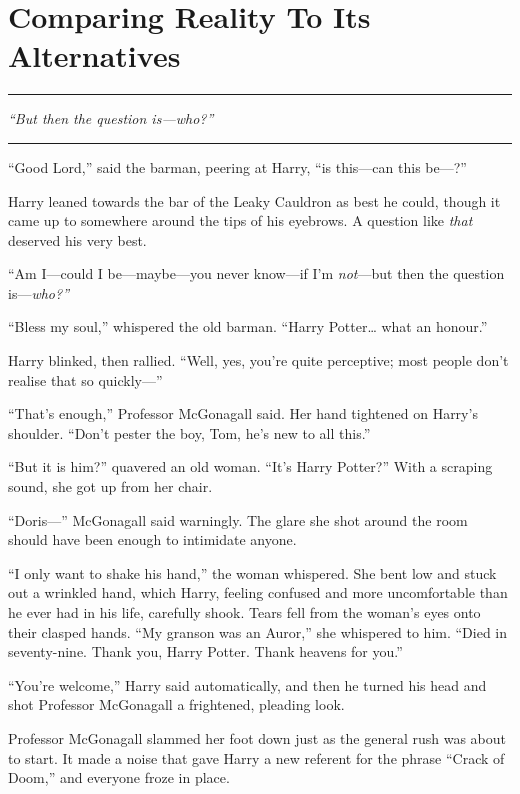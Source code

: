 \chapter{Comparing Reality To Its
Alternatives}\label{comparing-reality-to-its-alternatives}

\begin{center}\rule{3in}{0.4pt}\end{center}

\emph{``But then the question is---who?''}

\begin{center}\rule{3in}{0.4pt}\end{center}

``Good Lord,'' said the barman, peering at Harry, ``is this---can this
be---?''

Harry leaned towards the bar of the Leaky Cauldron as best he could,
though it came up to somewhere around the tips of his eyebrows. A
question like \emph{that} deserved his very best.

``Am I---could I be---maybe---you never know---if I'm \emph{not}---but
then the question is---\emph{who?''}

``Bless my soul,'' whispered the old barman. ``Harry Potter\ldots{} what
an honour.''

Harry blinked, then rallied. ``Well, yes, you're quite perceptive; most
people don't realise that so quickly---''

``That's enough,'' Professor McGonagall said. Her hand tightened on
Harry's shoulder. ``Don't pester the boy, Tom, he's new to all this.''

``But it is him?'' quavered an old woman. ``It's Harry Potter?'' With a
scraping sound, she got up from her chair.

``Doris---'' McGonagall said warningly. The glare she shot around the
room should have been enough to intimidate anyone.

``I only want to shake his hand,'' the woman whispered. She bent low and
stuck out a wrinkled hand, which Harry, feeling confused and more
uncomfortable than he ever had in his life, carefully shook. Tears fell
from the woman's eyes onto their clasped hands. ``My granson was an
Auror,'' she whispered to him. ``Died in seventy-nine. Thank you, Harry
Potter. Thank heavens for you.''

``You're welcome,'' Harry said automatically, and then he turned his
head and shot Professor McGonagall a frightened, pleading look.

Professor McGonagall slammed her foot down just as the general rush was
about to start. It made a noise that gave Harry a new referent for the
phrase ``Crack of Doom,'' and everyone froze in place.

